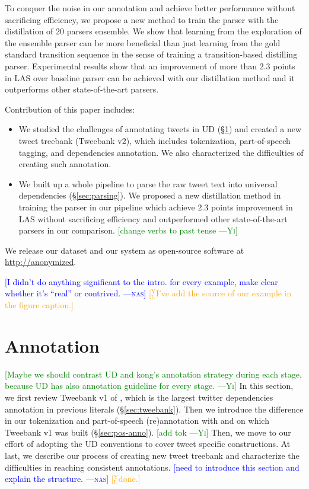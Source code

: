 \documentclass[11pt,a4paper]{article}
\newcommand{\yjcomment}[1]{\textcolor{orange}{[$_\mathrm{L}^\mathrm{Y}$#1]}}
\newcommand{\nascomment}[1]{\textcolor{blue}{[#1 ---\textsc{nas}]}}
\newcommand{\yicomment}[1]{\textcolor{green}{[#1 ---\textsc{Yi}]}}
\begin{document}
To conquer the noise in our annotation and achieve better performance
without sacrificing efficiency, we propose a new method to
train the parser with the distillation 
\cite{DBLP:journals/corr/HintonVD15} of 20 parsers ensemble.
We show that learning from the exploration of the ensemble parser
can be more beneficial than just learning from the gold standard
transition sequence in the sense of training a transition-based
distilling parser. Experimental results show that an improvement of more
than 2.3 points in LAS over baseline parser can be achieved with our
distillation method and it outperforms other state-of-the-art parsers.

Contribution of this paper includes:
\begin{itemize}
\item We studied the challenges of annotating tweets in UD (\S\ref{sec:anno})
and created a new tweet treebank ({\sc Tweebank v2}), which includes 
tokenization, part-of-speech tagging, and dependencies annotation.
We also characterized the difficulties of creating such annotation.

\item We built up a whole pipeline to parse the raw tweet text into
universal dependencies (\S\ref{sec:parsing}). We proposed a new distillation
method in training the parser in our pipeline which achieve 2.3 points improvement in LAS
without sacrificing efficiency and outperformed other state-of-the-art parsers
in our comparison. \yicomment{change verbs to past tense}
\end{itemize}

We release our dataset and our system as open-source software at
\url{http://anonymized}. 

\nascomment{I didn't do anything significant to the intro.  for every
  example, make clear whether it's ``real'' or contrived.}
\yjcomment{I've add the source of our example in the figure caption.}
\section{Annotation}\label{sec:anno}
\yicomment{Maybe we should contrast UD and kong's annotation strategy during each stage, because UD has also annotation guideline for every stage.}
In this section, we first review {\sc Tweebank v1} of \citet{kong-EtAl:2014:EMNLP2014},
which is the largest twitter dependencies annotation in previous literals (\S\ref{sec:tweebank}).
Then we introduce the difference in our tokenization and part-of-speech (re)annotation with \citet{ICWSM101540} and 
\citet{gimpel-EtAl:2011:ACL-HLT2011} on which {\sc Tweebank v1} was built (\S\ref{sec:pos-anno}). \yicomment{add tok} 
Then, we move to our effort of adopting the
UD conventions to cover tweet specific constructions. 
At last, we describe our process of creating new tweet treebank and characterize
the difficulties in reaching consistent annotations.
\nascomment{need to introduce this section and explain the structure.}
\yjcomment{done.}
\end{document}
